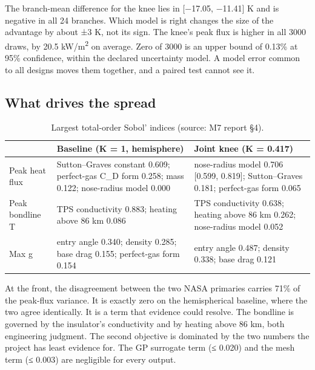 \documentclass[
  a4paper,
  11pt]{article}
\newcommand{\tabhead}[1]{{\sffamily\bfseries\fontsize{8.5}{10.5}\selectfont #1}}
\begin{document}
The branch-mean difference for the knee lies in {[}−17.05, −11.41{]} K
and is negative in all 24 branches. Which model is right changes the
size of the advantage by about ±3 K, not its sign. The knee's peak flux
is higher in all 3000 draws, by 20.5 kW/m\textsuperscript{2} on average.
Zero of 3000 is an upper bound of 0.13\% at 95\% confidence, within the
declared uncertainty model. A model error common to all designs moves
them together, and a paired test cannot see it.

\subsection{What drives the spread}

\begin{table}[htbp]
\caption{Largest total-order Sobol' indices (source: M7 report §4).}
\small\centering
\begin{tabular}{@{}>{\raggedright\arraybackslash}p{}>{\raggedright\arraybackslash}p{}>{\raggedright\arraybackslash}p{}@{}}
\toprule
\tabhead{Output} & \tabhead{Baseline (K = 1, hemisphere)} & \tabhead{Joint knee (K = 0.417)} \\
\midrule
Peak heat flux & Sutton--Graves constant 0.609; perfect-gas C\_D form 0.258; mass 0.122;
nose-radius model 0.000 & nose-radius model 0.706 {[}0.599, 0.819{]}; Sutton--Graves 0.181;
perfect-gas form 0.065 \\
Peak bondline T & TPS conductivity 0.883; heating above 86 km 0.086 & TPS conductivity 0.638; heating above 86 km 0.262; nose-radius model
0.052 \\
Max g & entry angle 0.340; density 0.285; base drag 0.155; perfect-gas form
0.154 & entry angle 0.487; density 0.338; base drag 0.121 \\
\bottomrule
\end{tabular}
\end{table}

At the front, the disagreement between the two NASA primaries carries
71\% of the peak-flux variance. It is exactly zero on the hemispherical
baseline, where the two agree identically. It is a term that evidence
could resolve. The bondline is governed by the insulator's conductivity
and by heating above 86 km, both engineering judgment. The second
objective is dominated by the two numbers the project has least evidence
for. The GP surrogate term (≤ 0.020) and the mesh term (≤ 0.003) are
negligible for every output.
\end{document}
